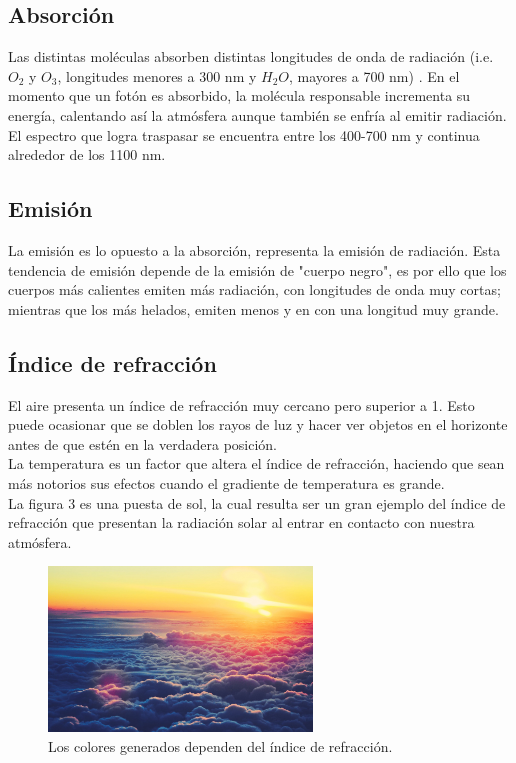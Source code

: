 \subsection{Absorción}
Las distintas moléculas absorben distintas longitudes de onda
de radiación (i.e. $O_2$ y $O_3$, longitudes menores a 300 nm
y $H_2 O$, mayores a 700 nm) . En el momento que un fotón es
absorbido, la molécula responsable incrementa su energía,
calentando así la atmósfera aunque también se enfría al emitir
radiación.
\\[3mm] El espectro que logra traspasar se encuentra entre los
400-700 nm y continua alrededor de los 1100 nm.

\subsection{Emisión}
La emisión es lo opuesto a la absorción, representa la emisión
de radiación. Esta tendencia de emisión depende de la emisión
de "cuerpo negro", es por ello que los cuerpos más calientes
emiten más radiación, con longitudes de onda muy cortas; mientras
que los más helados, emiten menos y en con una longitud muy grande.

\subsection{Índice de refracción}
El aire presenta un índice de refracción muy cercano pero superior
a 1. Esto puede ocasionar que se doblen los rayos de luz y hacer
ver objetos en el horizonte antes de que estén en la verdadera
posición.
\\ La temperatura es un factor que altera el índice de refracción,
haciendo que sean más notorios sus efectos cuando el gradiente de
temperatura es grande.
\\[3mm] La figura 3 es una puesta de sol, la cual resulta ser un gran
ejemplo del índice de refracción que presentan la radiación solar al
entrar en contacto con nuestra atmósfera.

\begin{figure}
\centering
\includegraphics[width=7cm]{Puesta}
\caption{\label{puesta}Los colores generados dependen del índice de refracción.}
\end{figure}

